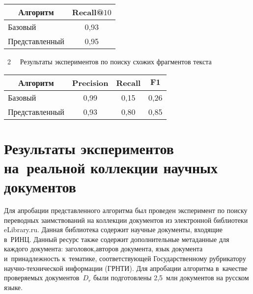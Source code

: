 \begin{multicols}{2}
\begin{center}
\vspace*{6pt}


{\small \begin{tabular}{|l|c|}
\hline 
\multicolumn{1}{|c|}{\bf Алгоритм} & \bf  Recall@$10$  \\ 
\hline
Базовый & 0,93\\
Представленный&  0,95 \\
\hline
\end{tabular}
}
\end{center}
\begin{center}
\noindent
\parbox{202pt}{{{\tablename~2}\ \ \small{
Результаты экспериментов по поиску схожих фрагментов текста
}}
}


\vspace*{6pt}

{\small 
\tabcolsep=7pt
\begin{tabular}{|l|c|c|c|}
\hline 
\multicolumn{1}{|c|}{\bf Алгоритм} &  \bf Precision & \bf Recall  &  $\mathbf{F1}$ \\\hline
Базовый &  0,99 & 0,15 & 0,26 \\
Представленный &  0,93 & 0,80 & 0,85 \\
\hline
\end{tabular}
}
\end{center}

\section{Результаты экспериментов на~реальной коллекции научных документов}

Для апробации представленного алгоритма был проведен эксперимент по поиску 
переводных заимствований на коллекции документов из электронной биб\-лио\-те\-ки 
{\sf eLibrary.ru}. Данная биб\-лио\-те\-ка содержит научные документы, входящие в~РИНЦ. 
Данный ресурс также содержит дополнительные\linebreak 
метаданные для каждого документа: заголовок,\linebreak авторов документа, язык документа 
и~принадлежность к~тематике, соответствующей Государственному рубрикатору 
на\-уч\-но-тех\-ни\-че\-ской информации (ГРНТИ).
Для апробации алгоритма в~качестве проверяемых документов~$D_r$ были 
подготовлены 2,5~млн документов на русском языке.


\end{multicols}

